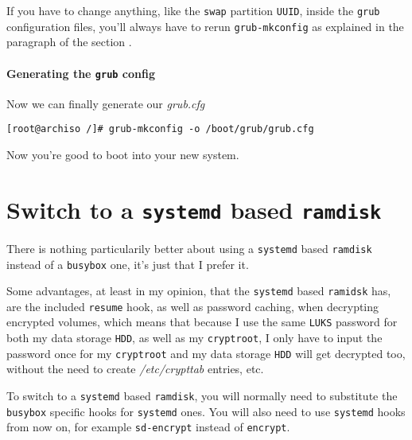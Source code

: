 \documentclass[10pt]{dustdoc}
\begin{document}
\begin{NOTE}
    If you have to change anything, like the \texttt{swap} partition \texttt{UUID}, inside the \texttt{grub} configuration files, you’ll always have to rerun \texttt{grub-mkconfig} as explained in the paragraph  of the section .
\end{NOTE}

\paragraph{Generating the \texttt{grub} config}
\label{par:generating-the-grub-config}

Now we can finally generate our \textit{grub.cfg}

\begin{verbatim}
[root@archiso /]# grub-mkconfig -o /boot/grub/grub.cfg
\end{verbatim}

Now you’re good to boot into your new system.

\section{Switch to a \texttt{systemd} based \texttt{ramdisk}}
\label{sec:switch-to-a-systemd-based-ramdisk}

\begin{NOTE}
    There is nothing particularily better about using a \texttt{systemd} based \texttt{ramdisk} instead of a \texttt{busybox} one, it’s just that I prefer it.

    Some advantages, at least in my opinion, that the \texttt{systemd} based \texttt{ramidsk} has, are the included \texttt{resume} hook, as well as password caching, when decrypting encrypted volumes, which means that because I use the same \texttt{LUKS} password for both my data storage \texttt{HDD}, as well as my \texttt{cryptroot}, I only have to input the password once for my \texttt{cryptroot} and my data storage \texttt{HDD} will get decrypted too, without the need to create \textit{/etc/crypttab} entries, etc.
\end{NOTE}

To switch to a \texttt{systemd} based \texttt{ramdisk}, you will normally need to substitute the \texttt{busybox} specific hooks for \texttt{systemd} ones.
You will also need to use \texttt{systemd} hooks from now on, for example \texttt{sd-encrypt} instead of \texttt{encrypt}.
\end{document}
